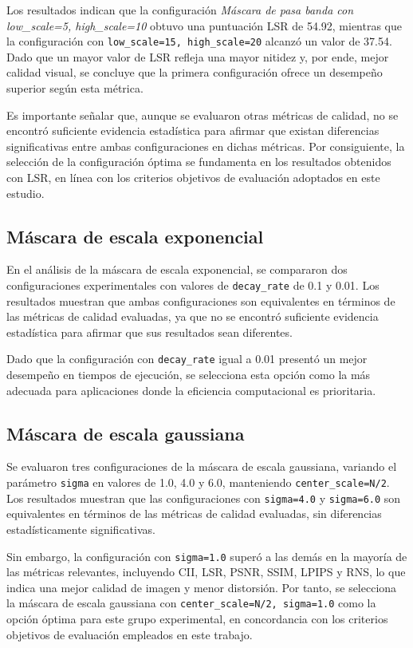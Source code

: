 Los resultados indican que la configuración \textit{Máscara de pasa banda con low\_scale=5, high\_scale=10} obtuvo una puntuación LSR de 54.92, mientras que la configuración con \texttt{low\_scale=15, high\_scale=20} alcanzó un valor de 37.54. Dado que un mayor valor de LSR refleja una mayor nitidez y, por ende, mejor calidad visual, se concluye que la primera configuración ofrece un desempeño superior según esta métrica.

Es importante señalar que, aunque se evaluaron otras métricas de calidad, no se encontró suficiente evidencia estadística para afirmar que existan diferencias significativas entre ambas configuraciones en dichas métricas. Por consiguiente, la selección de la configuración óptima se fundamenta en los resultados obtenidos con LSR, en línea con los criterios objetivos de evaluación adoptados en este estudio.

\subsection{Máscara de escala exponencial}

En el análisis de la máscara de escala exponencial, se compararon dos configuraciones experimentales con valores de \texttt{decay\_rate} de 0.1 y 0.01. Los resultados muestran que ambas configuraciones son equivalentes en términos de las métricas de calidad evaluadas, ya que no se encontró suficiente evidencia estadística para afirmar que sus resultados sean diferentes.

Dado que la configuración con \texttt{decay\_rate} igual a 0.01 presentó un mejor desempeño en tiempos de ejecución, se selecciona esta opción como la más adecuada para aplicaciones donde la eficiencia computacional es prioritaria.

\subsection{Máscara de escala gaussiana}

Se evaluaron tres configuraciones de la máscara de escala gaussiana, variando el parámetro \texttt{sigma} en valores de 1.0, 4.0 y 6.0, manteniendo \texttt{center\_scale=N/2}. Los resultados muestran que las configuraciones con \texttt{sigma=4.0} y \texttt{sigma=6.0} son equivalentes en términos de las métricas de calidad evaluadas, sin diferencias estadísticamente significativas.

Sin embargo, la configuración con \texttt{sigma=1.0} superó a las demás en la mayoría de las métricas relevantes, incluyendo CII, LSR, PSNR, SSIM, LPIPS y RNS, lo que indica una mejor calidad de imagen y menor distorsión. Por tanto, se selecciona la máscara de escala gaussiana con \texttt{center\_scale=N/2, sigma=1.0} como la opción óptima para este grupo experimental, en concordancia con los criterios objetivos de evaluación empleados en este trabajo.

